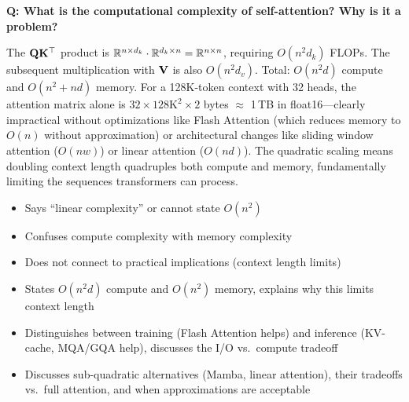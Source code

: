 \bigskip

\begin{interviewq}
\textbf{Q: What is the computational complexity of self-attention? Why is it a problem?}

 \quad {} \quad \badgefreq{\freqhigh}

\stronganswer
The $\mathbf{Q}\mathbf{K}^\top$ product is $\mathbb{R}^{n \times d_k} \cdot \mathbb{R}^{d_k \times n} = \mathbb{R}^{n \times n}$,
requiring $O(n^2 d_k)$ FLOPs.  The subsequent multiplication with $\mathbf{V}$ is also
$O(n^2 d_v)$.  Total: $O(n^2 d)$ compute and $O(n^2 + nd)$ memory.  For a
128K-token context with 32 heads, the attention matrix alone is
$32 \times 128\text{K}^2 \times 2$ bytes $\approx$ 1\,TB in float16---clearly
impractical without optimizations like Flash Attention (which reduces memory to
$O(n)$ without approximation) or architectural changes like sliding window
attention ($O(nw)$) or linear attention ($O(nd)$).  The quadratic scaling means
doubling context length quadruples both compute and memory, fundamentally
limiting the sequences transformers can process.

\redflags
\begin{itemize}
    \item Says ``linear complexity'' or cannot state $O(n^2)$
    \item Confuses compute complexity with memory complexity
    \item Does not connect to practical implications (context length limits)
\end{itemize}


\goodgreat
\begin{itemize}
    \item {} States $O(n^2 d)$ compute and $O(n^2)$ memory, explains
          why this limits context length
    \item {} Distinguishes between training (Flash Attention helps) and
          inference (KV-cache, MQA/GQA help), discusses the I/O vs.\ compute tradeoff
    \item {} Discusses sub-quadratic alternatives (Mamba, linear attention),
          their tradeoffs vs.\ full attention, and when approximations are acceptable
\end{itemize}

\end{interviewq}

